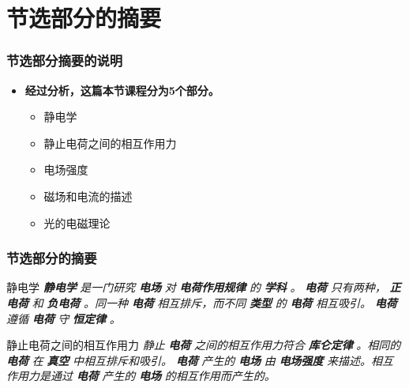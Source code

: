 \documentclass{beamer}%
\begin{document}
\section{节选部分的摘要}%
\begin{frame}%
\frametitle{\textsc{节选部分摘要的说明}}%
\begin{itemize}%
\item{\bf{经过分析，这篇本节课程分为5个部分。}}%
\begin{itemize}%
\item{静电学}%
\item{静止电荷之间的相互作用力}%
\item{电场强度}%
\item{磁场和电流的描述}%
\item{光的电磁理论}%
\end{itemize}%
\end{itemize}%
\end{frame}%
\begin{frame}%
\frametitle{\textsc{节选部分的摘要}}%
\begin{block}{静电学}%
\textit{}%
\textbf{\textit{静电学}}%
\textit{是一门研究}%
\textbf{\textit{电场}}%
\textit{对}%
\textbf{\textit{电荷作用规律}}%
\textit{的}%
\textbf{\textit{学科}}%
\textit{。}%
\textbf{\textit{电荷}}%
\textit{只有两种，}%
\textbf{\textit{正电荷}}%
\textit{和}%
\textbf{\textit{负电荷}}%
\textit{。同一种}%
\textbf{\textit{电荷}}%
\textit{相互排斥，而不同}%
\textbf{\textit{类型}}%
\textit{的}%
\textbf{\textit{电荷}}%
\textit{相互吸引。}%
\textbf{\textit{电荷}}%
\textit{遵循}%
\textbf{\textit{电荷}}%
\textit{守}%
\textbf{\textit{恒定律}}%
\textit{。}%
\end{block}%
\begin{alertblock}{静止电荷之间的相互作用力}%
\textit{静止}%
\textbf{\textit{电荷}}%
\textit{之间的相互作用力符合}%
\textbf{\textit{库仑定律}}%
\textit{。相同的}%
\textbf{\textit{电荷}}%
\textit{在}%
\textbf{\textit{真空}}%
\textit{中相互排斥和吸引。}%
\textbf{\textit{电荷}}%
\textit{产生的}%
\textbf{\textit{电场}}%
\textit{由}%
\textbf{\textit{电场强度}}%
\textit{来描述。相互作用力是通过}%
\textbf{\textit{电荷}}%
\textit{产生的}%
\textbf{\textit{电场}}%
\textit{的相互作用而产生的。}%
\end{alertblock}%
\end{frame}%
\end{document}
